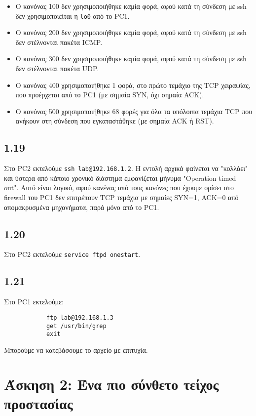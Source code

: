 \documentclass[a4paper, 12pt]{article}
\begin{document}
		\begin{itemize}
			\item Ο κανόνας 100 δεν χρησιμοποιήθηκε καμία φορά, αφού κατά τη σύνδεση με ssh δεν χρησιμοποιείται η \verb|lo0| από το PC1.
			\item Ο κανόνας 200 δεν χρησιμοποιήθηκε καμία φορά, αφού κατά τη σύνδεση με ssh δεν στέλνονται πακέτα ICMP.
			\item Ο κανόνας 300 δεν χρησιμοποιήθηκε καμία φορά, αφού κατά τη σύνδεση με ssh δεν στέλνονται πακέτα UDP.
			\item Ο κανόνας 400 χρησιμοποιήθηκε 1 φορά, στο πρώτο τεμάχιο της TCP χειραψίας, που προέρχεται από το PC1 (με σημαία SYN, όχι σημαία ACK).
			\item Ο κανόνας 500 χρησιμοποιήθηκε 68 φορές για όλα τα υπόλοιπα τεμάχια TCP που ανήκουν στη σύνδεση που εγκαταστάθηκε (με σημαία ACK ή RST).
		\end{itemize}  

	\subsection*{1.19}
		Στο PC2 εκτελούμε \verb|ssh lab@192.168.1.2|. Η εντολή αρχικά φαίνεται να "κολλάει" και ύστερα από κάποιο χρονικό διάστημα εμφανίζεται μήνυμα "Operation timed out". Αυτό είναι λογικό, αφού κανένας από τους κανόνες που έχουμε ορίσει στο firewall του PC1 δεν επιτρέπουν TCP τεμάχια με σημαίες SYN=1, ACK=0 από απομακρυσμένα μηχανήματα, παρά μόνο από το PC1.

	\subsection*{1.20}
		Στο PC2 εκτελούμε \verb|service ftpd onestart|.

	\subsection*{1.21}
		Στο PC1 εκτελούμε:
		
		\begin{verbatim}
			ftp lab@192.168.1.3
			get /usr/bin/grep
			exit
		\end{verbatim}

		Μπορούμε να κατεβάσουμε το αρχείο με επιτυχία.

\section*{Άσκηση 2: Ένα πιο σύνθετο τείχος προστασίας}
\end{document}
